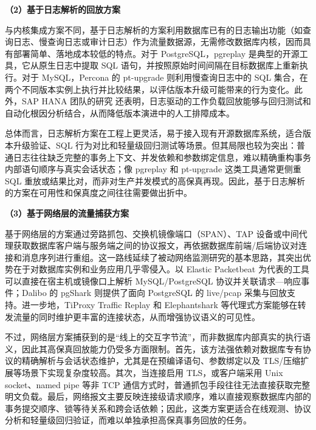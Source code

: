 \textbf{（2）基于日志解析的回放方案}

与内核集成方案不同，基于日志解析的方案利用数据库已有的日志输出功能（如查询日志、慢查询日志或审计日志）作为流量数据源，无需修改数据库内核，因而具有部署简单、落地成本较低的特点。对于 PostgreSQL，pgreplay\cite{pgreplay} 是典型的开源工具，它从原生日志中提取 SQL 语句，并按照原始时间间隔在目标数据库上重新执行。对于 MySQL，Percona 的 pt-upgrade\cite{ptupgrade} 则利用慢查询日志中的 SQL 集合，在两个不同版本实例上执行并比较结果，以评估版本升级可能带来的行为变化。此外，SAP HANA 团队的研究\cite{SAPHANAWorkloadReplay} 还表明，日志驱动的工作负载回放能够与回归测试和自动化根因分析结合，从而降低版本演进中的人工排障成本。

总体而言，日志解析方案在工程上更灵活，易于接入现有开源数据库系统，适合版本升级验证、SQL 行为对比和轻量级回归测试等场景。但其局限也较为突出：普通日志往往缺乏完整的事务上下文、并发依赖和参数绑定信息，难以精确重构事务内部语句顺序与真实会话状态；像 pgreplay 和 pt-upgrade 这类工具通常更侧重 SQL 重放或结果比对，而非对生产并发模式的高保真再现。因此，基于日志解析的方案在可用性和保真度之间往往需要做出折中。

\textbf{（3）基于网络层的流量捕获方案}

基于网络层的方案通过旁路抓包、交换机镜像端口（SPAN）、TAP 设备或中间代理获取数据库客户端与服务端之间的协议报文，再依据数据库前端/后端协议对连接和消息序列进行重组。这一路线延续了被动网络监测研究的基本思路\cite{PassiveMonitoringInfra}，其突出优势在于对数据库实例和业务应用几乎零侵入。以 Elastic Packetbeat\cite{PacketbeatOverview} 为代表的工具可以直接在宿主机或镜像口上解析 MySQL/PostgreSQL 协议并关联请求—响应事件；Dalibo 的 pgShark\cite{pgShark} 则提供了面向 PostgreSQL 的 live/pcap 采集与回放支持。进一步地，TiProxy Traffic Replay\cite{TiProxyTrafficReplay} 和 Elephantshark\cite{Elephantshark} 等代理式方案能够在转发流量的同时维护更丰富的连接状态，从而增强协议语义的可见性。

不过，网络层方案捕获到的是“线上的交互字节流”，而非数据库内部真实的执行语义，因此其高保真回放能力仍受多方面限制。首先，该方法强依赖对数据库专有协议的精确解析与会话状态维护，尤其是在预编译语句、参数绑定以及 TLS/压缩扩展等场景下实现复杂度较高\cite{protobuf,PacketbeatMySQLOptions}。其次，当连接启用 TLS，或客户端采用 Unix socket、named pipe 等非 TCP 通信方式时，普通抓包手段往往无法直接获取完整明文负载\cite{PacketbeatMySQLNoData,MySQLConnectionModes}。最后，网络报文主要反映连接级请求顺序，难以直接观察数据库内部的事务提交顺序、锁等待关系和跨会话依赖；因此，这类方案更适合在线观测、协议分析和轻量级回归验证，而难以单独承担高保真事务回放的任务。

